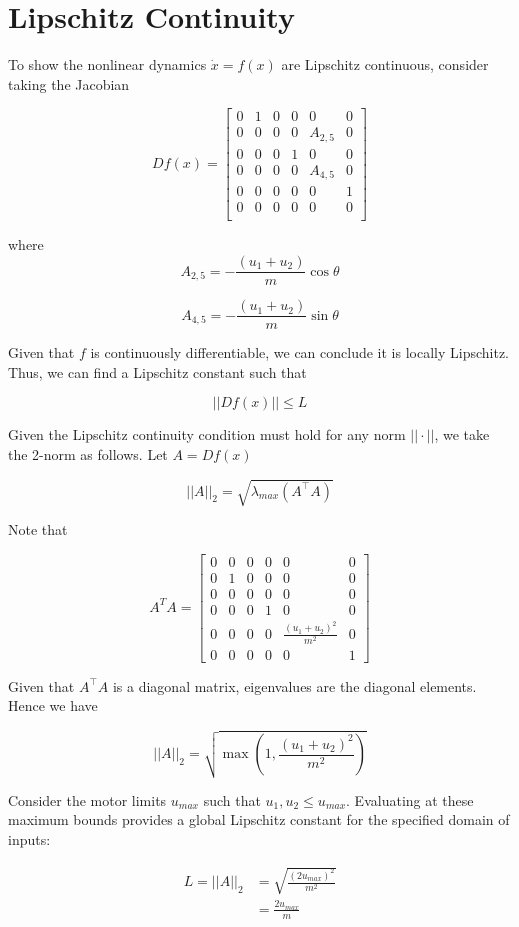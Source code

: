 \section{\textbf{Lipschitz Continuity}}

\noindent To show the nonlinear dynamics $\dot{x} = f(x)$ are Lipschitz continuous, consider taking the Jacobian 

\[ Df(x) = \begin{bmatrix}
    0 & 1 & 0 & 0 & 0 & 0 \\
    0 & 0 & 0 & 0 & A_{2,5} & 0 \\
    0 & 0 & 0 & 1 & 0 & 0 \\
    0 & 0 & 0 & 0 & A_{4,5} & 0 \\
    0 & 0 & 0 & 0 & 0 & 1 \\
    0 & 0 & 0 & 0 & 0 & 0 \\
\end{bmatrix} \]

\noindent where
\[ A_{2,5} = -\frac{(u_1 + u_2)}{m}\cos \theta \]

\[ A_{4,5} = -\frac{(u_1 + u_2)}{m}\sin \theta \]

\noindent Given that $f$ is continuously differentiable, we can conclude it is locally Lipschitz. Thus, we can find a Lipschitz constant such that

\[ ||Df(x)|| \leq L \]

\noindent Given the Lipschitz continuity condition must hold for any norm $||\cdot||$, we take the 2-norm as follows. Let $A = Df(x)$

\[ ||A||_2 = \sqrt{\lambda_{max} (A^\top A)} \]

\noindent Note that

\[ A^T A = \begin{bmatrix}
0 & 0 & 0 & 0 & 0 & 0 \\
0 & 1 & 0 & 0 & 0 & 0 \\
0 & 0 & 0 & 0 & 0 & 0 \\
0 & 0 & 0 & 1 & 0 & 0 \\
0 & 0 & 0 & 0 & \frac{(u_1+u_2)^2}{m^2} & 0 \\
0 & 0 & 0 & 0 & 0 & 1
\end{bmatrix} \]

\noindent Given that $A^\top A$ is a diagonal matrix, eigenvalues are the diagonal elements. Hence we have

\[ ||A||_2 = \sqrt{\max\left( 1, \frac{(u_1 + u_2)^2}{m^2}\right)}\]

\noindent Consider the motor limits $u_{max}$ such that $u_1, u_2 \leq u_{max}$. Evaluating at these maximum bounds provides a global Lipschitz constant for the specified domain of inputs:

\[ \begin{aligned}
    L = ||A||_2 &= \sqrt{\frac{(2 u_{max})^2}{m^2}} \\
            &= \frac{2 u_{max}}{m}
\end{aligned} \]
